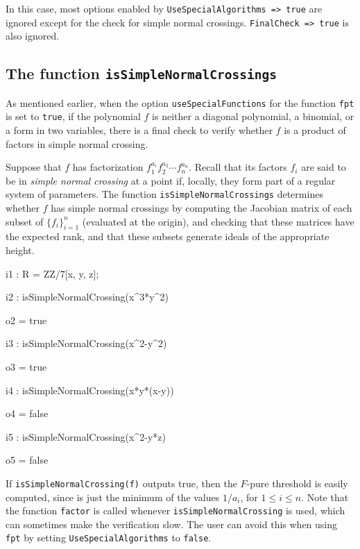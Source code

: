 \documentclass{amsart}
\begin{document}
\noindent In this case, most options enabled by {\tt UseSpecialAlgorithms => true}
are ignored except for the check for simple normal crossings.  {\tt FinalCheck => true}
is also ignored.

\subsection{The function {\tt isSimpleNormalCrossings}} \label{subsec.SNC}
As mentioned earlier,
when the option {\tt useSpecialFunctions} for the function {\tt fpt} is set to {\tt true}, if the polynomial $f$ is neither a diagonal polynomial, a binomial, or a form in two variables, there is a final check to verify whether $f$ is a product of factors in simple normal crossing.

Suppose that $f$ has factorization $f_1^{a_i} f_2^{a_2} \cdots f_n^{a_n}$.  Recall that its factors $f_i$ are said to be in
\emph{simple normal crossing} at a point if, locally, they form part of a regular system of parameters.  The function {\tt isSimpleNormalCrossings} determines whether $f$ has simple normal crossings by computing the Jacobian matrix of each subset of $\{ f_i \}_{i=1}^n$ (evaluated at the origin), and checking that these matrices have the expected rank, and that these subsets generate ideals of the appropriate height.

\medspace
{\small
{}
\begin{MyVerbatim}

i1 : R = ZZ/7[x, y, z];

i2 : isSimpleNormalCrossing(x^3*y^2)

o2 = true

i3 : isSimpleNormalCrossing(x^2-y^2)

o3 = true

i4 : isSimpleNormalCrossing(x*y*(x-y))

o4 = false

i5 : isSimpleNormalCrossing(x^2-y*z)

o5 = false
\end{MyVerbatim}
}
\medspace


If {\tt isSimpleNormalCrossing(f)} outputs true, then the $F$-pure threshold is easily computed, since is just the minimum of the values $1/a_i$, for $1 \leq i \leq n$.
Note that the function {\tt factor} is called whenever {\tt isSimpleNormalCrossing} is used, which can sometimes make the verification slow.  The user can avoid this when using {\tt fpt} by setting {\tt UseSpecialAlgorithms} to {\tt false}.
\end{document}
